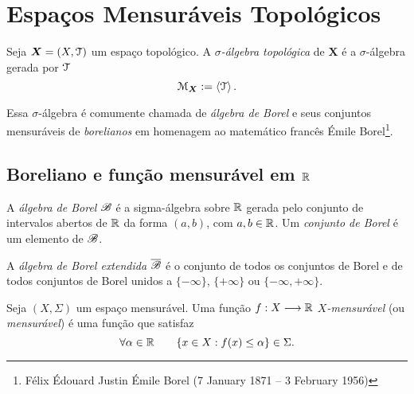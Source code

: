\clearpage
\section{Espaços Mensuráveis Topológicos}

\begin{defi}
Seja $\bm X=(X,\mathcal{T})$ um espaço topológico. A \emph{$\sigma$-álgebra topológica} de $\bm X$ é a $\sigma$-álgebra gerada por $\mathcal{T}$
	\begin{equation*}
	\mathcal{M}_{\bm X} := \left\langle \mathcal{T} \right\rangle.
	\end{equation*}
\end{defi}

Essa $\sigma$-álgebra é comumente chamada de \emph{álgebra de Borel} e seus conjuntos mensuráveis de \emph{borelianos} em homenagem ao matemático francês Émile Borel\footnote{Félix Édouard Justin Émile Borel (7 January 1871 – 3 February 1956)}.


\subsection{Boreliano e função mensurável em $\mathbb{R}$}

\begin{defi}
	A \emph{álgebra de Borel} $\mathscr{B}$ é a sigma-álgebra sobre $\mathbb{R}$ gerada pelo conjunto de intervalos abertos de $\mathbb{R}$ da forma $(a,b)$, com $a,b \in \mathbb{R}$. Um \emph{conjunto de Borel} é um elemento de $\mathscr{B}$.
\end{defi}

\begin{defi}
	A \emph{álgebra de Borel extendida} $\overline{\mathscr{B}}$ é o conjunto de todos os conjuntos de Borel e de todos conjuntos de Borel unidos a $\{-\infty\}$, $\{+\infty\}$ ou $\{-\infty,+\infty\}$.
\end{defi}

\begin{defi}
	Seja $(X,\Sigma)$ um espaço mensurável. Uma função $f: X \longrightarrow \mathbb{R}$ \emph{$X$-mensurável} (ou \emph{mensurável}) é uma função que satisfaz
	\begin{equation*}
	\forall \alpha \in \mathbb{R} \qquad \{x \in X : f(x) \leq \alpha\} \in \Sigma.
	\end{equation*}
\end{defi}

